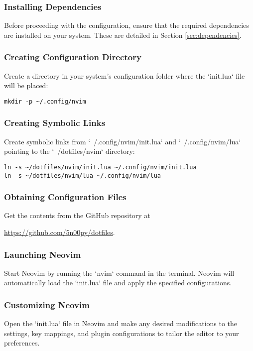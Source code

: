 \documentclass{article}
\begin{document}
\subsubsection{Installing Dependencies}
Before proceeding with the configuration, ensure that the required dependencies 
are installed on your system. These are detailed in Section \ref{sec:dependencies}.

\subsubsection{Creating Configuration Directory}
Create a directory in your system's configuration folder where the `init.lua` 
file will be placed:
\begin{verbatim}
mkdir -p ~/.config/nvim
\end{verbatim}

\subsubsection{Creating Symbolic Links}
Create symbolic links from `~/.config/nvim/init.lua` and `~/.config/nvim/lua` 
pointing to the `~/dotfiles/nvim` directory:
\begin{verbatim}
ln -s ~/dotfiles/nvim/init.lua ~/.config/nvim/init.lua
ln -s ~/dotfiles/nvim/lua ~/.config/nvim/lua
\end{verbatim}

\subsubsection{Obtaining Configuration Files}
Get the contents from the GitHub repository at 

\href{https://github.com/5n00py/dotfiles}{https://github.com/5n00py/dotfiles}.

\subsubsection{Launching Neovim}
Start Neovim by running the `nvim` command in the terminal. Neovim will 
automatically load the `init.lua` file and apply the specified configurations.

\subsubsection{Customizing Neovim}
Open the `init.lua` file in Neovim and make any desired modifications to the 
settings, key mappings, and plugin configurations to tailor the editor to your 
preferences.
\end{document}
